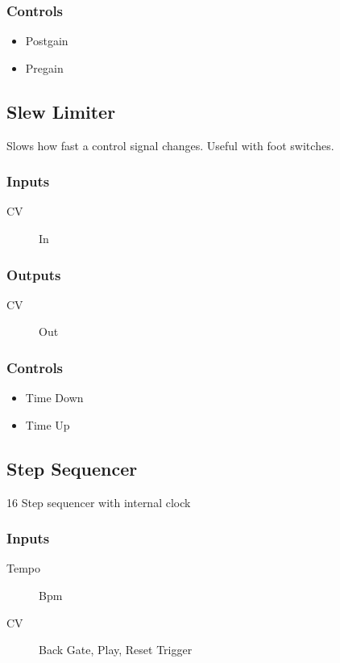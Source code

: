 \subsubsection{Controls}
\begin{itemize}
\item Postgain
\item Pregain
\end{itemize}

\subsection{Slew Limiter}

Slows how fast a control signal changes. Useful with foot switches.



\subsubsection{Inputs}
\begin{description}
\item [CV] In
\end{description}

\subsubsection{Outputs}
\begin{description}
\item [CV] Out
\end{description}

\subsubsection{Controls}
\begin{itemize}
\item Time Down
\item Time Up
\end{itemize}

\subsection{Step Sequencer}

16 Step sequencer with internal clock



\subsubsection{Inputs}
\begin{description}
\item [Tempo] Bpm
\item [CV] Back Gate, Play, Reset Trigger
\end{description}

